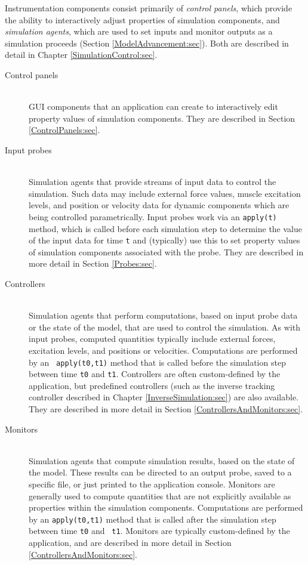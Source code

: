 Instrumentation components consist primarily of {\it control panels}, which
provide the ability to interactively adjust properties of simulation
components, and {\it simulation agents}, which are used to set inputs and
monitor outputs as a simulation proceeds
(Section \ref{ModelAdvancement:sec}). Both are described in detail in
Chapter \ref{SimulationControl:sec}.

\begin{description}

\item[Control panels] \mbox{}\hfill\\
GUI components that an application can create to interactively edit property
values of simulation components. They are described in
Section \ref{ControlPanels:sec}.

\item[Input probes] \mbox{}\hfill\\
Simulation agents that provide streams of input data to control the
simulation. Such data may include external force values, muscle excitation
levels, and position or velocity data for dynamic components which are being
controlled parametrically. Input probes work via an {\tt apply(t)} method,
which is called before each simulation step to determine the value of
the input data for time {\tt t} and (typically) use this to set
property values of simulation components associated with the probe.  They are
described in more detail in Section \ref{Probes:sec}.

\item[Controllers] \mbox{}\hfill\\
Simulation agents that perform computations, based on input probe data or the
state of the model, that are used to control the simulation.  As with input
probes, computed quantities typically include external forces, excitation
levels, and positions or velocities.  Computations are performed by an {\tt
apply(t0,t1)} method that is called before the simulation step between time
{\tt t0} and {\tt t1}. Controllers are often custom-defined by the application,
but predefined controllers (such as the inverse tracking controller described
in Chapter \ref{InverseSimulation:sec}) are also available. They are
described in more detail in Section \ref{ControllersAndMonitors:sec}.

\item[Monitors] \mbox{}\hfill\\
Simulation agents that compute simulation results, based on the state of the
model. These results can be directed to an output probe, saved to a specific
file, or just printed to the application console. Monitors are generally used
to compute quantities that are not explicitly available as properties within
the simulation components. Computations are performed by an {\tt apply(t0,t1)}
method that is called after the simulation step between time {\tt t0} and {\tt
t1}. Monitors are typically custom-defined by the application, and are
described in more detail in Section \ref{ControllersAndMonitors:sec}.


\end{description}

